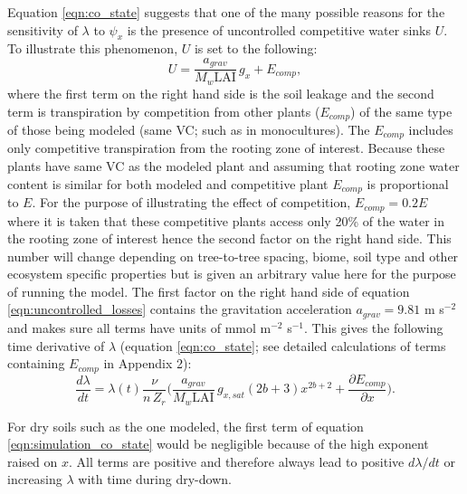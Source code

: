 \documentclass[utf8]{frontiersSCNS} %
\begin{document}
Equation \ref{eqn:co_state} suggests that one of the many possible reasons for the sensitivity of $\lambda$ to $\psi_x$ is the presence of uncontrolled competitive water sinks $U$. To illustrate this phenomenon, $U$ is set to the following:
\begin{equation}
    U = \frac{a_{grav}}{M_w \text{LAI}} \, g_x + E_{comp},
    \label{eqn:uncontrolled_losses}
\end{equation}
where the first term on the right hand side is the soil leakage and the second term is transpiration by competition from other plants ($E_{comp}$) of the same type of those being modeled (same VC; such as in monocultures). The $E_{comp}$ includes only competitive transpiration from the rooting zone of interest. Because these plants have same VC as the modeled plant and assuming that rooting zone water content is similar for both modeled and competitive plant $E_{comp}$ is proportional to $E$. For the purpose of illustrating the effect of competition, $E_{comp} = 0.2 E$ where it is taken that these competitive plants access only 20\% of the water in the rooting zone of interest hence the second factor on the right hand side. This number will change depending on tree-to-tree spacing, biome, soil type and other ecosystem specific properties but is given an arbitrary value here for the purpose of running the model. The first factor on the right hand side of equation \ref{eqn:uncontrolled_losses} contains the gravitation acceleration $a_{grav} = 9.81$ m s$^{-2}$ and makes sure all terms have units of mmol m$^{-2}$ s$^{-1}$. This gives the following time derivative of $\lambda$ (equation \ref{eqn:co_state}; see detailed calculations of terms containing $E_{comp}$ in Appendix 2):
\begin{equation}
        \frac{d\lambda}{dt} = \lambda(t) \frac{\nu}{n\, Z_r} \Bigg( \frac{a_{grav}}{M_w \text{LAI}}\, g_{x,sat} (2b+3) x^{2b+2} + \frac{\partial E_{comp}}{\partial x} \Bigg).
    \label{eqn:simulation_co_state}
\end{equation}

For dry soils such as the one modeled, the first term of equation \ref{eqn:simulation_co_state} would be negligible because of the high exponent raised on $x$. All terms are positive and therefore always lead to positive $d\lambda/dt$ or increasing $\lambda$ with time during dry-down.
\end{document}
